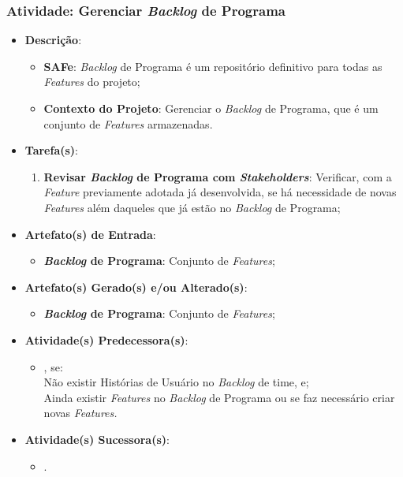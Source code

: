 			\subsubsection[Atividade: Gerenciar \emph{Backlog} de Programa]{Atividade: Gerenciar \emph{Backlog} de Programa}
			\label{subsubsec:processo_atividade_programa_gerenciar}
				\begin{itemize}
					\item{\textbf{Descrição}:
						\begin{itemize}
							\item{\textbf{SAFe}: \emph{Backlog} de Programa é um repositório definitivo para todas as \emph{Features} do projeto;}
							\item{\textbf{Contexto do Projeto}: Gerenciar o \emph{Backlog} de Programa, que é um conjunto de \emph{Features} armazenadas.}
						\end{itemize}}
					\item{\textbf{Tarefa(s)}:
						\begin{enumerate}
							\item{\textbf{Revisar \emph{Backlog} de Programa com \emph{Stakeholders}}: Verificar, com a \emph{Feature} previamente adotada já desenvolvida, se há necessidade de novas \emph{Features} além daqueles que já estão no \emph{Backlog} de Programa;}
						\end{enumerate}}
					\item{\textbf{Artefato(s) de Entrada}:
						\begin{itemize}
							\item{\textbf{\emph{Backlog} de Programa}: Conjunto de \emph{Features};}
						\end{itemize}}
					\item{\textbf{Artefato(s) Gerado(s) e/ou Alterado(s)}:
						\begin{itemize}
							\item{\textbf{\emph{Backlog} de Programa}: Conjunto de \emph{Features};}
						\end{itemize}}
					\item{\textbf{Atividade(s) Predecessora(s)}:
						\begin{itemize}
							\item{, se:
							\\ Não existir Histórias de Usuário no \emph{Backlog} de time, e;
							\\ Ainda existir \emph{Features} no \emph{Backlog} de Programa ou se faz necessário criar novas \emph{Features.}}
						\end{itemize}}
					\item{\textbf{Atividade(s) Sucessora(s)}:
						\begin{itemize}
							\item{.}
						\end{itemize}}
				\end{itemize}

